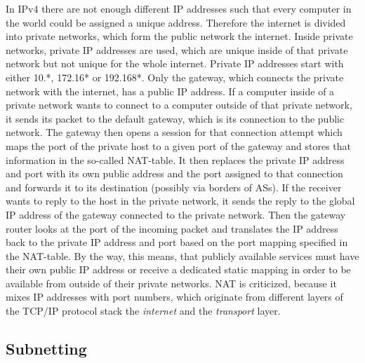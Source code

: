 In \ac{IP}v4 there are not enough different IP addresses such that every computer in the world could be assigned a unique address. Therefore the internet is divided into private networks, which form the public network \textendash{} the internet. Inside private networks, private IP addresses are used, which are unique inside of that private network but not unique for the whole internet. Private IP addresses start with either 10.*, 172.16* or 192.168*. Only the gateway, which connects the private network with the internet, has a public IP address. If a computer inside of a private network wants to connect to a computer outside of that private network, it sends its packet to the default gateway, which is its connection to the public network. The gateway then opens a session for that connection attempt which maps the port of the private host to a given port of the gateway and stores that information in the so-called \ac{NAT}-table. It then replaces the private IP address and port with its own public address and the port assigned to that connection and forwards it to its destination (possibly via borders of \acl{AS}s). If the receiver wants to reply to the host in the private network, it sends the reply to the global IP address of the gateway connected to the private network. Then the gateway router looks at the port of the incoming packet and translates the IP address back to the private IP address and port based on the port mapping specified in the \ac{NAT}-table. By the way, this means, that publicly available services must have their own public IP address or receive a dedicated static mapping in order to be available from outside of their private networks. \ac{NAT} is criticized, because it mixes IP addresses with port numbers, which originate from different layers of the \ac{TCP}/\ac{IP} protocol stack \textendash{} the \textit{internet} and the \textit{transport} layer.

\subsection{Subnetting}

